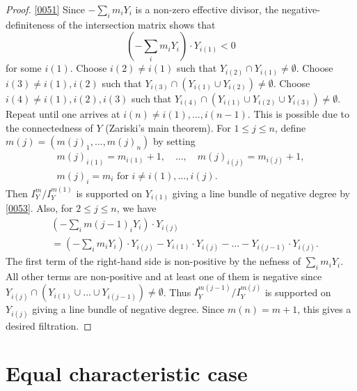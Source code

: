 \documentclass{amsart}
\theoremstyle{remark}
\numberwithin{equation}{section}
\begin{document}
\begin{proof}
	\eqref{0051}
	Since $- \sum_{i} m_{i} Y_{i}$ is a non-zero effective divisor,
	the negative-definiteness of the intersection matrix shows that
		\begin{equation} \label{0053}
					\left(
						- \sum_{i} m_{i} Y_{i}
					\right)
				\cdot
					Y_{i(1)}
			<
				0
		\end{equation}
	for some $i(1)$.
	Choose $i(2) \ne i(1)$ such that $Y_{i(2)} \cap Y_{i(1)} \ne \emptyset$.
	Choose $i(3) \ne i(1), i(2)$ such that $Y_{i(3)} \cap (Y_{i(1)} \cup Y_{i(2)}) \ne \emptyset$.
	Choose $i(4) \ne i(1), i(2), i(3)$ such that $Y_{i(4)} \cap (Y_{i(1)} \cup Y_{i(2)} \cup Y_{i(3)}) \ne \emptyset$.
	Repeat until one arrives at $i(n) \ne i(1), \dots, i(n - 1)$.
	This is possible due to the connectedness of $Y$ (Zariski's main theorem).
	For $1 \le j \le n$,
	define $m(j) = (m(j)_{1}, \dots, m(j)_{n})$ by setting
		\begin{gather*}
					m(j)_{i(1)} = m_{i(1)} + 1,
				\quad \dots, \quad
					m(j)_{i(j)} = m_{i(j)} + 1,
			\\
					m(j)_{i} = m_{i}
				\text{ for }
					i \ne i(1), \dots, i(j).
		\end{gather*}
	Then $I_{Y}^{m} / I_{Y}^{m(1)}$ is supported on $Y_{i(1)}$
	giving a line bundle of negative degree by \eqref{0053}.
	Also, for $2 \le j \le n$, we have
		\begin{align*}
			&
						\left(
							- \sum_{i} m(j - 1)_{i} Y_{i}
						\right)
					\cdot
						Y_{i(j)}
			\\
			&	=
							\left(
								- \sum_{i} m_{i} Y_{i}
							\right)
						\cdot
							Y_{i(j)}
					-
						Y_{i(1)} \cdot Y_{i(j)}
					-
						\dots
					-
						Y_{i(j - 1)} \cdot Y_{i(j)}.
		\end{align*}
	The first term of the right-hand side is non-positive
	by the nefness of $\sum_{i} m_{i} Y_{i}$.
	All other terms are non-positive and at least one of them is negative
	since $Y_{i(j)} \cap (Y_{i(1)} \cup \dots \cup Y_{i(j - 1)}) \ne \emptyset$.
	Thus $I_{Y}^{m(j - 1)} / I_{Y}^{m(j)}$ is supported on $Y_{i(j)}$
	giving a line bundle of negative degree.
	Since $m(n) = m + 1$, this gives a desired filtration.
\end{proof}


\section{Equal characteristic case}
\label{0035}
\end{document}
